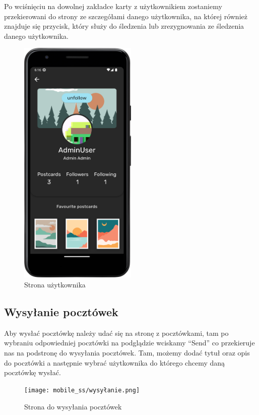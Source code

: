 \documentclass[a4paper,twoside,12pt]{book}
\begin{document}
Po wciśnięciu na dowolnej zakładce karty z użytkownikiem zostaniemy przekierowani do strony ze szczegółami danego użytkownika, na której również znajduje się przycisk, który służy do śledzenia lub zrezygnowania ze śledzenia danego użytkownika. 
\newpage
\begin{figure}[H]
    \centering
    \includegraphics[width=0.5\textwidth]{mobile_ss/friend.png}
    \caption{Strona użytkownika}
\end{figure}
\newpage
\subsection{Wysyłanie pocztówek}
Aby wysłać pocztówkę należy udać się na stronę z pocztówkami, tam po wybraniu odpowiedniej pocztówki na podglądzie wciskamy ``Send'' co przekieruje nas na podstronę do wysyłania pocztówek. Tam, możemy dodać tytuł oraz opis do pocztówki a następnie wybrać użytkownika do którego chcemy daną pocztówkę wysłać. 

\begin{figure}[H]
    \centering
    \texttt{[image: mobile\_ss/wysyłanie.png]}
    \caption{Strona do wysyłania pocztówek}
\end{figure}


\end{document}

